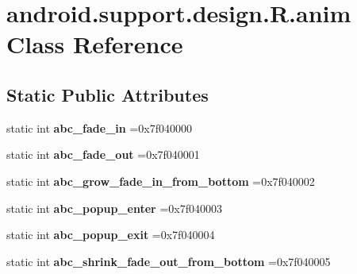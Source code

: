 \hypertarget{classandroid_1_1support_1_1design_1_1R_1_1anim}{}\section{android.\+support.\+design.\+R.\+anim Class Reference}
\label{classandroid_1_1support_1_1design_1_1R_1_1anim}
\subsection*{Static Public Attributes}
\begin{DoxyCompactItemize}
\item 
\mbox{\label{classandroid_1_1support_1_1design_1_1R_1_1anim_a00ba2bc2deb507b2c30dda23c3c0cc21}} 
static int {\bfseries abc\+\_\+fade\+\_\+in} =0x7f040000
\item 
\mbox{\label{classandroid_1_1support_1_1design_1_1R_1_1anim_abd2c7ac6c27a6a19553ad6ae529ee6c9}} 
static int {\bfseries abc\+\_\+fade\+\_\+out} =0x7f040001
\item 
\mbox{\label{classandroid_1_1support_1_1design_1_1R_1_1anim_a5efcd038a6fd1f115691539ea25590f6}} 
static int {\bfseries abc\+\_\+grow\+\_\+fade\+\_\+in\+\_\+from\+\_\+bottom} =0x7f040002
\item 
\mbox{\label{classandroid_1_1support_1_1design_1_1R_1_1anim_ab34d6c20f6c15f90b2d9cd346e02b629}} 
static int {\bfseries abc\+\_\+popup\+\_\+enter} =0x7f040003
\item 
\mbox{\label{classandroid_1_1support_1_1design_1_1R_1_1anim_ad4d8237b97279652701a4ff7c5ada49e}} 
static int {\bfseries abc\+\_\+popup\+\_\+exit} =0x7f040004
\item 
\mbox{\label{classandroid_1_1support_1_1design_1_1R_1_1anim_a930236d9492bc57ee881a784918aa858}} 
static int {\bfseries abc\+\_\+shrink\+\_\+fade\+\_\+out\+\_\+from\+\_\+bottom} =0x7f040005
\item 
\mbox{\label{classandroid_1_1support_1_1design_1_1R_1_1anim_ad312ae4b1df8e3793872526d5a658f3c}} 

\end{DoxyCompactItemize}
